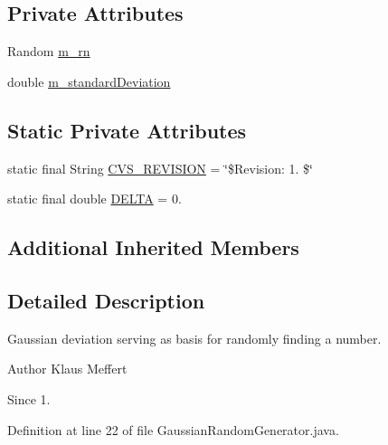 \subsection*{Private Attributes}
\begin{DoxyCompactItemize}
\item 
Random \hyperlink{classorg_1_1jgap_1_1impl_1_1_gaussian_random_generator_a37f7ceea3a0a9230371f2de2ee947ed0}{m\-\_\-rn}
\item 
double \hyperlink{classorg_1_1jgap_1_1impl_1_1_gaussian_random_generator_a6682c3135c973d1dae2d061ebb90a5cc}{m\-\_\-standard\-Deviation}
\end{DoxyCompactItemize}
\subsection*{Static Private Attributes}
\begin{DoxyCompactItemize}
\item 
static final String \hyperlink{classorg_1_1jgap_1_1impl_1_1_gaussian_random_generator_a076a5c47f1bbaea7bf0cdb3e0d97972a}{C\-V\-S\-\_\-\-R\-E\-V\-I\-S\-I\-O\-N} = \char`\"{}\$Revision\-: 1. \$\char`\"{}
\item 
static final double \hyperlink{classorg_1_1jgap_1_1impl_1_1_gaussian_random_generator_adda7e9fd5a5b01d4a8ea3706ec5dc6f8}{D\-E\-L\-T\-A} = 0.
\end{DoxyCompactItemize}
\subsection*{Additional Inherited Members}


\subsection{Detailed Description}
Gaussian deviation serving as basis for randomly finding a number.

\begin{DoxyAuthor}{Author}
Klaus Meffert 
\end{DoxyAuthor}
\begin{DoxySince}{Since}
1. 
\end{DoxySince}


Definition at line 22 of file Gaussian\-Random\-Generator.\-java.



